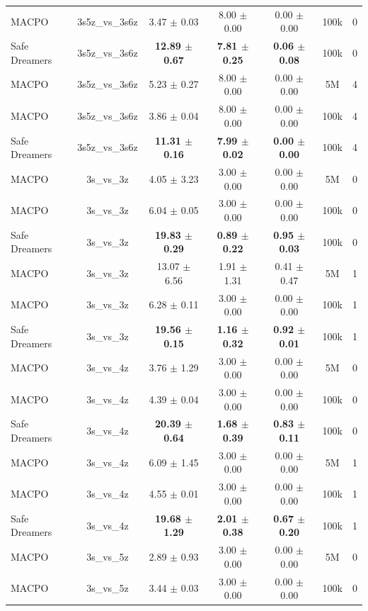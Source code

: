 \begin{longtable}{lcccccc}
MACPO & 3s5z\_vs\_3s6z & 3.47 $\pm$ 0.03 & 8.00 $\pm$ 0.00 & 0.00 $\pm$ 0.00 & 100k & 0 \\
Safe Dreamers & 3s5z\_vs\_3s6z & \textbf{12.89 $\pm$ 0.67} & \textbf{7.81 $\pm$ 0.25} & \textbf{0.06 $\pm$ 0.08} & 100k & 0 \\
\midrule
MACPO & 3s5z\_vs\_3s6z & 5.23 $\pm$ 0.27 & 8.00 $\pm$ 0.00 & 0.00 $\pm$ 0.00 & 5M & 4 \\
MACPO & 3s5z\_vs\_3s6z & 3.86 $\pm$ 0.04 & 8.00 $\pm$ 0.00 & 0.00 $\pm$ 0.00 & 100k & 4 \\
Safe Dreamers & 3s5z\_vs\_3s6z & \textbf{11.31 $\pm$ 0.16} & \textbf{7.99 $\pm$ 0.02} & \textbf{0.00 $\pm$ 0.00} & 100k & 4 \\
\midrule
MACPO & 3s\_vs\_3z & 4.05 $\pm$ 3.23 & 3.00 $\pm$ 0.00 & 0.00 $\pm$ 0.00 & 5M & 0 \\
MACPO & 3s\_vs\_3z & 6.04 $\pm$ 0.05 & 3.00 $\pm$ 0.00 & 0.00 $\pm$ 0.00 & 100k & 0 \\
Safe Dreamers & 3s\_vs\_3z & \textbf{19.83 $\pm$ 0.29} & \textbf{0.89 $\pm$ 0.22} & \textbf{0.95 $\pm$ 0.03} & 100k & 0 \\
\midrule
MACPO & 3s\_vs\_3z & 13.07 $\pm$ 6.56 & 1.91 $\pm$ 1.31 & 0.41 $\pm$ 0.47 & 5M & 1 \\
MACPO & 3s\_vs\_3z & 6.28 $\pm$ 0.11 & 3.00 $\pm$ 0.00 & 0.00 $\pm$ 0.00 & 100k & 1 \\
Safe Dreamers & 3s\_vs\_3z & \textbf{19.56 $\pm$ 0.15} & \textbf{1.16 $\pm$ 0.32} & \textbf{0.92 $\pm$ 0.01} & 100k & 1 \\
\midrule
MACPO & 3s\_vs\_4z & 3.76 $\pm$ 1.29 & 3.00 $\pm$ 0.00 & 0.00 $\pm$ 0.00 & 5M & 0 \\
MACPO & 3s\_vs\_4z & 4.39 $\pm$ 0.04 & 3.00 $\pm$ 0.00 & 0.00 $\pm$ 0.00 & 100k & 0 \\
Safe Dreamers & 3s\_vs\_4z & \textbf{20.39 $\pm$ 0.64} & \textbf{1.68 $\pm$ 0.39} & \textbf{0.83 $\pm$ 0.11} & 100k & 0 \\
\midrule
MACPO & 3s\_vs\_4z & 6.09 $\pm$ 1.45 & 3.00 $\pm$ 0.00 & 0.00 $\pm$ 0.00 & 5M & 1 \\
MACPO & 3s\_vs\_4z & 4.55 $\pm$ 0.01 & 3.00 $\pm$ 0.00 & 0.00 $\pm$ 0.00 & 100k & 1 \\
Safe Dreamers & 3s\_vs\_4z & \textbf{19.68 $\pm$ 1.29} & \textbf{2.01 $\pm$ 0.38} & \textbf{0.67 $\pm$ 0.20} & 100k & 1 \\
\midrule
MACPO & 3s\_vs\_5z & 2.89 $\pm$ 0.93 & 3.00 $\pm$ 0.00 & 0.00 $\pm$ 0.00 & 5M & 0 \\
MACPO & 3s\_vs\_5z & 3.44 $\pm$ 0.03 & 3.00 $\pm$ 0.00 & 0.00 $\pm$ 0.00 & 100k & 0 \\

\end{longtable}
